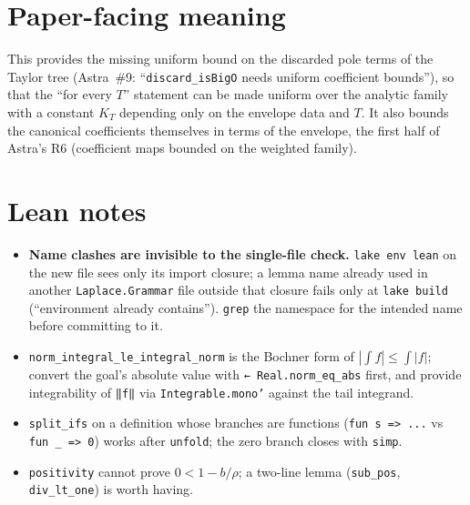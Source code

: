 \documentclass[11pt]{article}
\begin{document}
\section{Paper-facing meaning}

This provides the missing uniform bound on the discarded pole terms of the Taylor tree (Astra~\#9:
``\texttt{discard\_isBigO} needs uniform coefficient bounds''), so that the ``for every $T$''
statement can be made uniform over the analytic family with a constant $K_T$ depending only on the
envelope data and $T$. It also bounds the canonical coefficients themselves in terms of the envelope,
the first half of Astra's R6 (coefficient maps bounded on the weighted family).

\section{Lean notes}

\begin{itemize}
\item \textbf{Name clashes are invisible to the single-file check.} \texttt{lake env lean} on the new
file sees only its import closure; a lemma name already used in another \texttt{Laplace.Grammar}
file outside that closure fails only at \texttt{lake build} (``environment already contains'').
\texttt{grep} the namespace for the intended name before committing to it.
\item \texttt{norm\_integral\_le\_integral\_norm} is the Bochner form of $|\int f|\le\int|f|$;
convert the goal's absolute value with \texttt{← Real.norm\_eq\_abs} first, and provide
integrability of \texttt{‖f‖} via \texttt{Integrable.mono'} against the tail integrand.
\item \texttt{split\_ifs} on a definition whose branches are functions (\texttt{fun s => ...} vs
\texttt{fun \_ => 0}) works after \texttt{unfold}; the zero branch closes with \texttt{simp}.
\item \texttt{positivity} cannot prove $0<1-b/\rho$; a two-line lemma
(\texttt{sub\_pos}, \texttt{div\_lt\_one}) is worth having.
\end{itemize}
\end{document}
